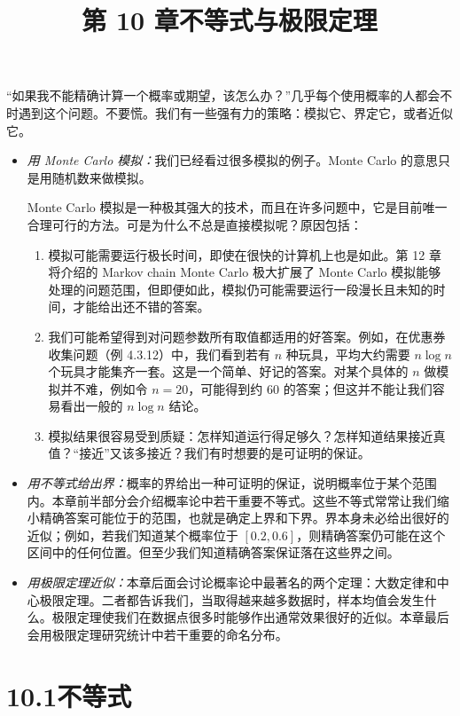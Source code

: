 \documentclass[UTF8, 12pt, fontset=fandol, oneside]{ctexart}
\title{第 10 章\quad 不等式与极限定理}
\author{}
\date{}
\begin{document}
\maketitle

“如果我不能精确计算一个概率或期望，该怎么办？”几乎每个使用概率的人都会不时遇到这个问题。不要慌。我们有一些强有力的策略：模拟它、界定它，或者近似它。

\begin{itemize}
  \item \textit{用 Monte Carlo 模拟：}我们已经看过很多模拟的例子。Monte Carlo 的意思只是用随机数来做模拟。

  Monte Carlo 模拟是一种极其强大的技术，而且在许多问题中，它是目前唯一合理可行的方法。可是为什么不总是直接模拟呢？原因包括：
  \begin{enumerate}
    \item 模拟可能需要运行极长时间，即使在很快的计算机上也是如此。第 12 章将介绍的 Markov chain Monte Carlo 极大扩展了 Monte Carlo 模拟能够处理的问题范围，但即便如此，模拟仍可能需要运行一段漫长且未知的时间，才能给出还不错的答案。
    \item 我们可能希望得到对问题参数所有取值都适用的好答案。例如，在优惠券收集问题（例 4.3.12）中，我们看到若有 $n$ 种玩具，平均大约需要 $n\log n$ 个玩具才能集齐一套。这是一个简单、好记的答案。对某个具体的 $n$ 做模拟并不难，例如令 $n=20$，可能得到约 $60$ 的答案；但这并不能让我们容易看出一般的 $n\log n$ 结论。
    \item 模拟结果很容易受到质疑：怎样知道运行得足够久？怎样知道结果接近真值？“接近”又该多接近？我们有时想要的是可证明的保证。
  \end{enumerate}

  \item \textit{用不等式给出界：}概率的界给出一种可证明的保证，说明概率位于某个范围内。本章前半部分会介绍概率论中若干重要不等式。这些不等式常常让我们缩小精确答案可能位于的范围，也就是确定上界和下界。界本身未必给出很好的近似；例如，若我们知道某个概率位于 $[0.2,0.6]$，则精确答案仍可能在这个区间中的任何位置。但至少我们知道精确答案保证落在这些界之间。

  \item \textit{用极限定理近似：}本章后面会讨论概率论中最著名的两个定理：大数定律和中心极限定理。二者都告诉我们，当取得越来越多数据时，样本均值会发生什么。极限定理使我们在数据点很多时能够作出通常效果很好的近似。本章最后会用极限定理研究统计中若干重要的命名分布。
\end{itemize}

\section*{10.1\quad 不等式}
\end{document}

